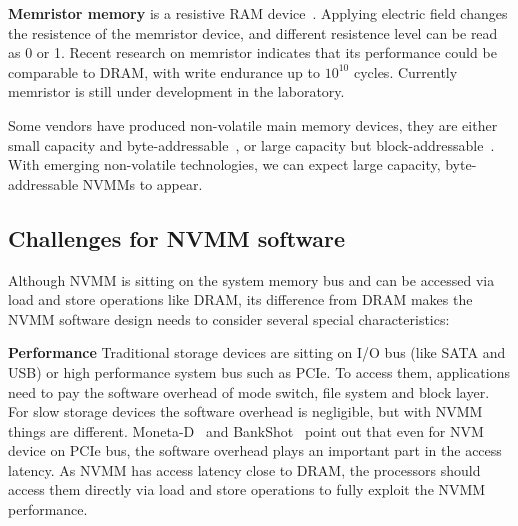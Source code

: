 \textbf{Memristor memory} is a resistive RAM device~\cite{memristor}.
Applying electric field
changes the resistence of the memristor device, and different resistence level
can be read as 0 or 1. Recent research on memristor indicates that its
performance could be comparable to DRAM, with write endurance up to $10^{10}$
cycles. Currently memristor is still under development in the laboratory.
 
Some vendors have produced non-volatile main memory devices, they are
either small capacity and byte-addressable~\cite{micron-nvdimm},
or large capacity but block-addressable~\cite{smart-system}.
With emerging non-volatile technologies, we can expect
large capacity, byte-addressable NVMMs to appear.

\begin{table}
	\vspace*{1mm}
	\caption{}
	\label{table:techtrend}
\end{table}

\subsection{Challenges for NVMM software}
\label{sec:challenge}

Although NVMM is sitting on the system memory bus and can be accessed
via load and store operations like DRAM, its difference from DRAM
makes the NVMM software design needs to consider several special
characteristics:

\textbf{Performance} Traditional storage devices are sitting on I/O bus
(like SATA and USB) or high performance system bus such as PCIe. To access
them, applications need to pay the software overhead of mode switch, 
file system and
block layer. For slow storage devices the software overhead is negligible,
but with NVMM things are different. Moneta-D~\cite{monetad} and
BankShot~\cite{BankShot} point out that even for NVM device on PCIe bus,
the software overhead plays an important part in the access latency.
As NVMM has access latency close to
DRAM, the processors should access them directly via load and store
operations to fully exploit the NVMM performance.


